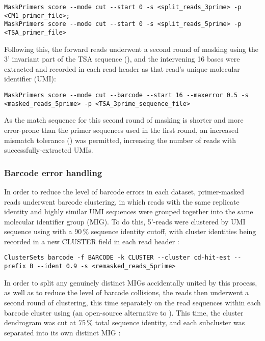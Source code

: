 \begin{lstlisting}
MaskPrimers score --mode cut --start 0 -s <split_reads_3prime> -p <CM1_primer_file>;
MaskPrimers score --mode cut --start 0 -s <split_reads_5prime> -p <TSA_primer_file>
\end{lstlisting}

\noindent Following this, the forward reads underwent a second round of masking using the 3' invariant part of the TSA sequence (), and the intervening 16 bases were extracted and recorded in each read header as that read's unique molecular identifier (UMI):

\begin{lstlisting}
MaskPrimers score --mode cut --barcode --start 16 --maxerror 0.5 -s <masked_reads_5prime> -p <TSA_3prime_sequence_file>
\end{lstlisting}

\noindent As the match sequence for this second round of masking is shorter and more error-prone than the primer sequences used in the first round, an increased mismatch tolerance () was permitted, increasing the number of reads with successfully-extracted UMIs.

\subsubsection{Barcode error handling}
\label{sec:methods_comp_igpreproc_correct}

In order to reduce the level of barcode errors in each dataset, primer-masked \igseq reads underwent barcode clustering, in which reads with the same replicate identity and highly similar UMI sequences were grouped together into the same molecular identifier group (MIG). To do this, 5'-reads were clustered by UMI sequence using   \parencite{li2006cdhit,fu2012cdhit} with a 90\,\% sequence identity cutoff, with cluster identities being recorded in a new CLUSTER field in each read header \parencite{vanderheiden2018perscomm}:

\begin{lstlisting}
ClusterSets barcode -f BARCODE -k CLUSTER --cluster cd-hit-est --prefix B --ident 0.9 -s <remasked_reads_5prime>
\end{lstlisting}

\noindent In order to split any genuinely distinct MIGs accidentally united by this process, as well as to reduce the level of barcode collisions, the reads then underwent a second round of clustering, this time separately on the read sequences within each barcode cluster using  (an open-source alternative to  \parencite{edgar2010usearch,rognes2016vsearch}).
This time, the cluster dendrogram was cut at 75\,\% total sequence identity, and each subcluster was separated into its own distinct MIG \parencite{vanderheiden2018perscomm}:

